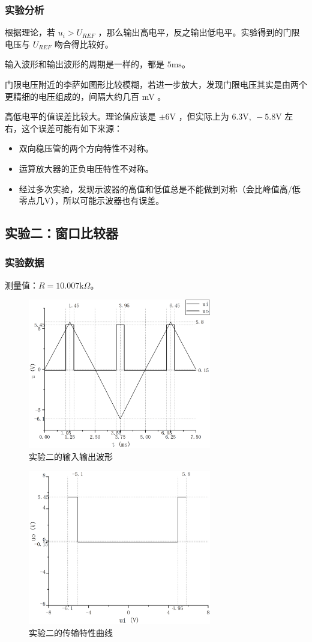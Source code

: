 \documentclass[a4paper,11pt,UTF8]{ctexart}
\newcommand\mr[1]{\mathrm{#1}}
\begin{document}
	\subsubsection{实验分析}
		根据理论，若 $u_i>U_{REF}$ ，那么输出高电平，反之输出低电平。实验得到的门限电压与 $U_{REF}$ 吻合得比较好。
		\par 输入波形和输出波形的周期是一样的，都是 $5\mr{ms}$。
		\par 门限电压附近的李萨如图形比较模糊，若进一步放大，发现门限电压其实是由两个更精细的电压组成的，间隔大约几百 mV 。
		\par 高低电平的值误差比较大。理论值应该是 $\pm6\mr{V}$ ，但实际上为 $6.3\mr{V},~-5.8\mr{V}$ 左右，这个误差可能有如下来源：
		\begin{itemize}
		 \item 双向稳压管的两个方向特性不对称。
		 \item 运算放大器的正负电压特性不对称。
		 \item 经过多次实验，发现示波器的高值和低值总是不能做到对称（会比峰值高/低零点几V），所以可能示波器也有误差。
		\end{itemize}

\subsection{实验二：窗口比较器}
	\subsubsection{实验数据}
		测量值：$R=10.007\mr{k}\Omega$。
		\begin{figure}[H]
		 \centering
		 \includegraphics[width=8cm]{2-1}
		 \caption{实验二的输入输出波形}
		 \label{fig:2-1}
		\end{figure}
		\begin{figure}[H]
		 \centering
		 \includegraphics[width=8cm]{2-2}
		 \caption{实验二的传输特性曲线}
		 \label{fig:2-2}
		\end{figure}
\end{document}
